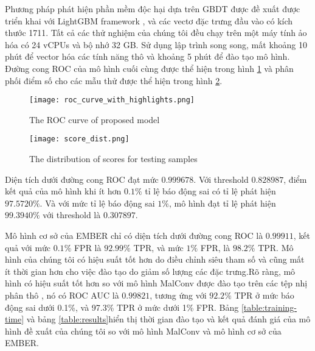 Phương pháp phát hiện phần mềm độc hại dựa trên GBDT được đề xuất được triển khai với LightGBM framework \cite{ke2017lightgbm}, và các vectơ đặc trưng đầu vào có kích thước 1711. Tất cả các thử nghiệm của chúng tôi đều chạy trên một máy tính ảo hóa có 24 vCPUs và bộ nhớ 32 GB. Sử dụng lập trình song song, mất khoảng 10 phút để vector hóa các tính năng thô và khoảng 5 phút để đào tạo mô hình. Đường cong ROC của mô hình cuối cùng được thể hiện trong hình \ref{fig:roc_curve_with_highlights} và phân phối điểm số cho các mẫu thử được thể hiện trong hình \ref{fig:score_dist}.

\begin{figure}[H]
\centering
\texttt{[image: roc\_curve\_with\_highlights.png]}
\caption{The ROC curve of proposed model}
\label{fig:roc_curve_with_highlights}
\end{figure}

\begin{figure}[h] 
\centering
\texttt{[image: score\_dist.png]}
\caption{The distribution of scores for testing samples}
\label{fig:score_dist}
\end{figure}

Diện tích dưới đường cong ROC đạt mức $0.999678$. Với threshold $0.828987$, điểm kết quả của mô hình khi ít hơn $0.1\%$ tỉ lệ báo động sai có tỉ lệ phát hiện $97.5720\%$. Và với mức tỉ lệ báo động sai $1\%$, mô hình đạt tỉ lệ phát hiện $99.3940\%$ với threshold là $0.307897$. 

Mô hình cơ sở của EMBER chỉ có diện tích dưới đường cong ROC là $0.99911$, kết quả với mức $0.1\%$ FPR là $92.99\%$ TPR, và mức $1\%$ FPR, là $98.2\%$ TPR. Mô hình của chúng tôi có hiệu suất tốt hơn do điều chỉnh siêu tham số và cũng mất ít thời gian hơn cho việc đào tạo do giảm số lượng các đặc trưng.Rõ ràng, mô hình có hiệu suất tốt hơn so với mô hình MalConv được đào tạo trên các tệp nhị phân thô \cite{anderson2018ember}, nó có ROC AUC là $0.99821$, tương ứng với $92.2\%$ TPR ở mức báo động sai dưới 0.1\%, và 97.3\% TPR ở mức dưới 1\% FPR. Bảng \ref{table:training-time} và bảng \ref{table:results}hiển thị thời gian đào tạo và kết quả đánh giá của mô hình đề xuất của chúng tôi so với mô hình MalConv và mô hình cơ sở của EMBER.

